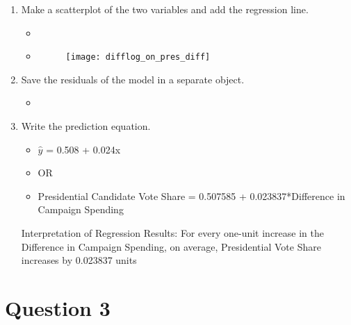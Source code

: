 \documentclass[12pt,letterpaper]{article}
\begin{document}
\begin{enumerate}
		\item Make a scatterplot of the two variables and add the regression line. 
	

\begin{itemize}
	\item 
	\item 	\begin{figure}[h]
		\centering
		\texttt{[image: difflog\_on\_pres\_diff]}
	\end{figure} 
\end{itemize}


		\item Save the residuals of the model in a separate object.	

\begin{itemize}
	\item 
\end{itemize}


		\item Write the prediction equation.
		
\begin{itemize}
	\item $\hat{y}$ = 0.508 + 0.024x
	\item OR
	\item Presidential Candidate Vote Share =  0.507585 + 0.023837*Difference in Campaign Spending
\end{itemize}

Interpretation of Regression Results: For every one-unit increase in the Difference in Campaign Spending, on average, Presidential Vote Share increases by 0.023837 units

	\end{enumerate}

\section*{Question 3}
\end{document}
